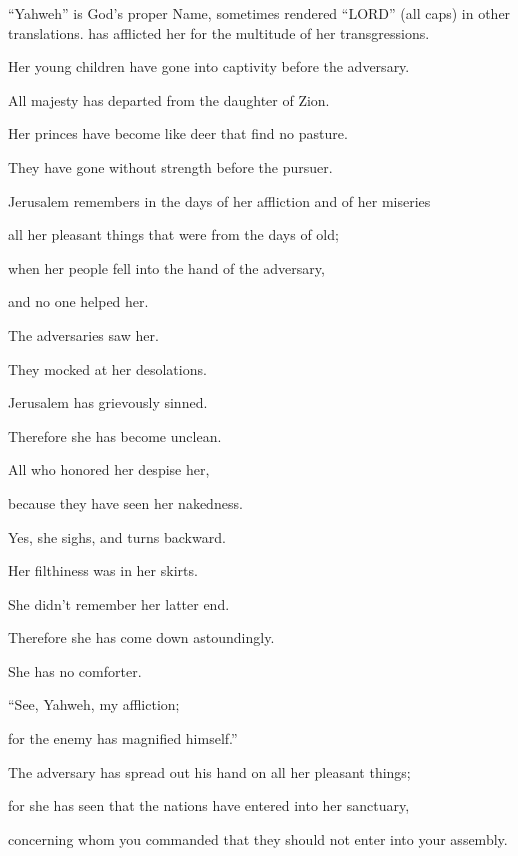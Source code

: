{{“Yahweh” is God’s proper Name, sometimes rendered “LORD” (all caps) in other translations.} has afflicted her for the multitude of her transgressions.
\par }{\QB Her young children have gone into captivity before the adversary.
\par }{\BB \par }{\Q {}All majesty has departed from the daughter of Zion.
\par }{\QB Her princes have become like deer that find no pasture.
\par }{\QB They have gone without strength before the pursuer.
\par }{\BB \par }{\Q {}Jerusalem remembers in the days of her affliction and of her miseries
\par }{\QB all her pleasant things that were from the days of old;
\par }{\Q when her people fell into the hand of the adversary,
\par }{\QB and no one helped her.
\par }{\Q The adversaries saw her.
\par }{\QB They mocked at her desolations.
\par }{\BB \par }{\Q {}Jerusalem has grievously sinned.
\par }{\QB Therefore she has become unclean.
\par }{\Q All who honored her despise her,
\par }{\QB because they have seen her nakedness.
\par }{\QB Yes, she sighs, and turns backward.
\par }{\BB \par }{\Q {}Her filthiness was in her skirts.
\par }{\QB She didn’t remember her latter end.
\par }{\Q Therefore she has come down astoundingly.
\par }{\QB She has no comforter.
\par }{\Q “See, Yahweh, my affliction;
\par }{\QB for the enemy has magnified himself.”
\par }{\BB \par }{\Q {}The adversary has spread out his hand on all her pleasant things;
\par }{\QB for she has seen that the nations have entered into her sanctuary,
\par }{\QB concerning whom you commanded that they should not enter into your assembly.
}
